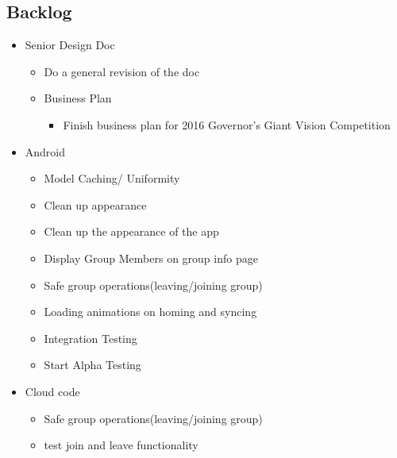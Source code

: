 \subsection{Backlog}
\begin{itemize}
	\item Senior Design Doc
	\begin{itemize}
		\item Do a general revision of the doc
	\end{itemize}
	\begin{itemize}
		\item Business Plan
		\begin{itemize}
			\item Finish business plan for 2016 Governor's Giant Vision Competition
		\end{itemize}
	\end{itemize}
	\item Android
	\begin{itemize}
		\item Model Caching/ Uniformity
		\item Clean up appearance
		\item Clean up the appearance of the app
		\item Display Group Members on group info page
		\item Safe group operations(leaving/joining group)
		\item Loading animations on homing and syncing
		\item Integration Testing
		\item Start Alpha Testing
	\end{itemize}
	\item Cloud code
	\begin{itemize}
		\item Safe group operations(leaving/joining group)
		\item test join and leave functionality
	\end{itemize}
\end{itemize}
